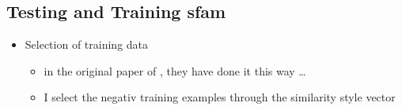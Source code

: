 \subsection{Testing and Training \acs{sfam}}

\begin{itemize}
  \item Selection of training data
        \begin{itemize}
          \item in the original paper of \textcite{patelLearningInterpretableStyle2023}, they have done it this way \ldots
          \item I select the negativ training examples through the similarity style vector
        \end{itemize}
\end{itemize}